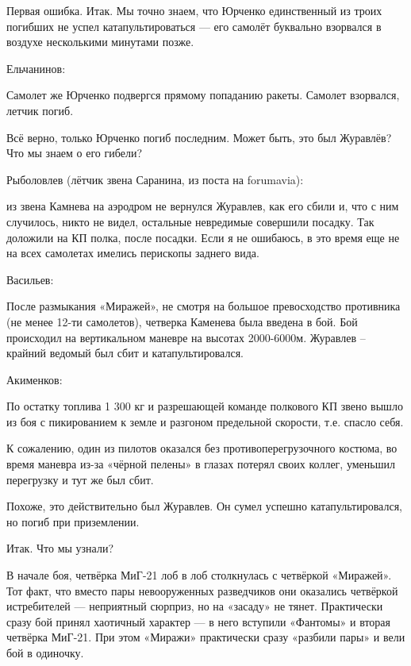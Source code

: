 Первая ошибка. Итак. Мы точно знаем, что Юрченко единственный из троих погибших не успел катапультироваться — его самолёт буквально взорвался в воздухе несколькими минутами позже.

Ельчанинов:

\begin{textcitation}
	Самолет же Юрченко подвергся прямому попаданию ракеты. Самолет взорвался, летчик погиб.
\end{textcitation}

Всё верно, только Юрченко погиб последним. Может быть, это был Журавлёв? Что мы знаем о его гибели?

Рыболовлев (лётчик звена Саранина, из поста на forumavia):

\begin{textcitation}
	из звена Камнева на аэродром не вернулся Журавлев, как его сбили и, что с ним случилось, никто не видел, остальные невредимые совершили посадку. Так доложили на КП полка, после посадки. Если я не ошибаюсь, в это время еще не на всех самолетах имелись перископы заднего вида.
\end{textcitation}
Васильев:

\begin{textcitation}
	После размыкания «Миражей», не смотря на большое превосходство противника (не менее 12-ти самолетов), четверка Каменева была введена в бой. Бой происходил на вертикальном маневре на высотах 2000-6000м. Журавлев – крайний ведомый был сбит и катапультировался.
\end{textcitation}

Акименков:

\begin{textcitation}
	По остатку топлива 1 300 кг и разрешающей команде полкового КП звено вышло из боя с пикированием к земле и разгоном предельной скорости, т.е. спасло себя.
	
	К сожалению, один из пилотов оказался без противоперегрузочного костюма, во время маневра из-за «чёрной пелены» в глазах потерял своих коллег, уменьшил перегрузку и тут же был сбит.
\end{textcitation}

Похоже, это действительно был Журавлев. Он сумел успешно катапультировался, но погиб при приземлении.

Итак. Что мы узнали?

В начале боя, четвёрка МиГ-21 лоб в лоб столкнулась с четвёркой «Миражей». Тот факт, что вместо пары невооруженных разведчиков они оказались четвёркой истребителей — неприятный сюрприз, но на «засаду» не тянет. Практически сразу бой принял хаотичный характер — в него вступили «Фантомы» и вторая четвёрка МиГ-21. При этом «Миражи» практически сразу «разбили пары» и вели бой в одиночку.

